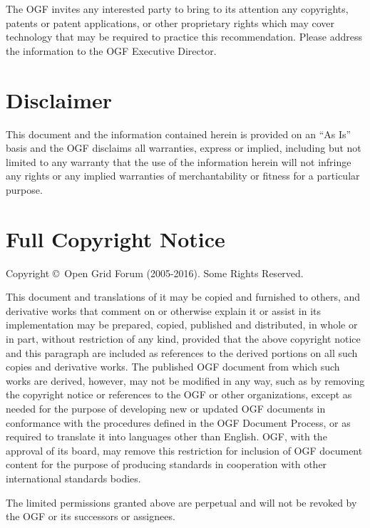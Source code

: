 \documentclass{article}
\newcommand{\copyrightyears}{2005-2016}
\begin{document}
 The OGF invites any interested party to bring to its attention any
 copyrights, patents or patent applications, or other proprietary
 rights which may cover technology that may be required to practice
 this recommendation.  Please address the information to the OGF
 Executive Director.


\section{Disclaimer}

 This document and the information contained herein is provided on an
 ``As Is'' basis and the OGF disclaims all warranties, express or
 implied, including but not limited to any warranty that the use of
 the information herein will not infringe any rights or any implied
 warranties of merchantability or fitness for a particular purpose.


\section{Full Copyright Notice}

 Copyright \copyright \ Open Grid Forum (\copyrightyears). Some Rights
 Reserved.

 This document and translations of it may be copied and furnished to
 others, and derivative works that comment on or otherwise explain it
 or assist in its implementation may be prepared, copied, published
 and distributed, in whole or in part, without restriction of any
 kind, provided that the above copyright notice and this paragraph are
 included as references to the derived portions on all such copies and
 derivative works. The published OGF document from which such works
 are derived, however, may not be modified in any way, such as by
 removing the copyright notice or references to the OGF or other
 organizations, except as needed for the purpose of developing new or
 updated OGF documents in conformance with the procedures defined in
 the OGF Document Process, or as required to translate it into
 languages other than English. OGF, with the approval of its board,
 may remove this restriction for inclusion of OGF document content for
 the purpose of producing standards in cooperation with other
 international standards bodies.

 The limited permissions granted above are perpetual and will not be
 revoked by the OGF or its successors or assignees.

\end{document}
